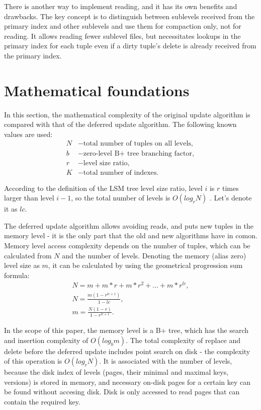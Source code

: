 \documentclass{vldb}
\begin{document}
There is another way to implement reading, and it has its own benefits and
drawbacks. The key concept is to distinguish between sublevels received
from the primary index and other sublevels and use them for compaction
only, not for reading. It allows reading fewer sublevel files, but necessitates
lookups in the primary index for each tuple even if a dirty tuple's delete is
already received from the primary index.

\section{Mathematical foundations}

In this section, the mathematical complexity of the original update algorithm is
compared with that of the deferred update algorithm. The following known
values are used:
\begin{align*}
N &- \text{total number of tuples on all levels}, \\
b &- \text{zero-level B+ tree branching factor}, \\
r &- \text{level size ratio}, \\
K &- \text{total number of indexes}.
\end{align*}

According to the definition of the LSM tree level size ratio, level $i$ is $r$ times
larger than level $i - 1$, so the total number of levels is $O(log_rN)$
\cite{kai:slimdb}. Let's denote it as $lc$.

The deferred update algorithm allows avoiding reads, and puts new tuples in the
memory level - it is the only part that the old and new algorithms have in comon.
Memory level access complexity depends on the number of tuples, which can be
calculated from $N$ and the number of levels. Denoting the memory (alias zero)
level size as $m$, it can be calculated by using the geometrical progression sum formula:
\begin{gather*}
N = m + m*r + m*r^2 + ... + m*r^{lc}, \\
N = \frac{m(1 - r^{lc+1})}{1 - lc}, \\
m = \frac{N(1 - r)}{1 - r^{lc + 1}}.
\end{gather*}

In the scope of this paper, the memory level is a B+ tree, which has the
search and insertion complexity of $O(log_bm)$. The total complexity of
replace and delete before the deferred update includes point search on
disk - the complexity of this operation is $O(log_rN)$. It is associated
with the number of levels, because the disk index of levels (pages, their minimal and
maximal keys, versions) is stored in memory, and necessary on-disk pages for a
certain key can be found without accesing disk. Disk is only accessed to read
pages that can contain the required key.
\end{document}
